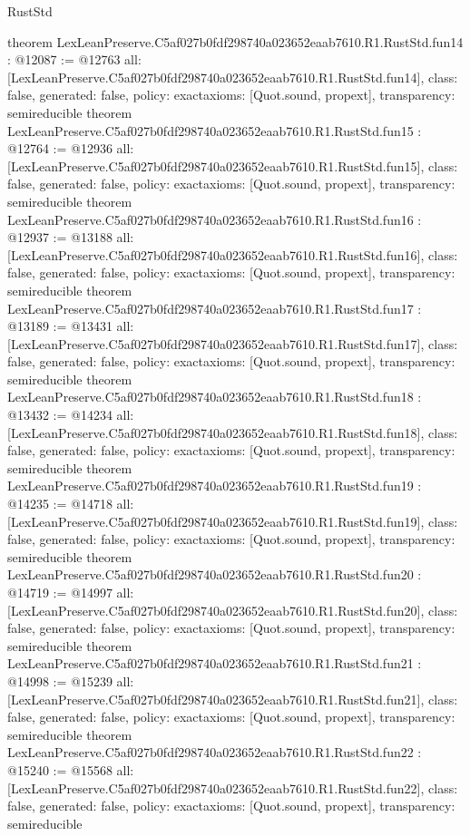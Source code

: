 \begin{lexlean}{RustStd}
\begin{coremodule}
{}
theorem LexLeanPreserve.C5af027b0fdf298740a023652eaab7610.R1.RustStd.fun14 : @12087 := @12763 {
  all: [LexLeanPreserve.C5af027b0fdf298740a023652eaab7610.R1.RustStd.fun14],
  class: false,
  generated: false,
  policy: exact{axioms: [Quot.sound, propext]},
  transparency: semireducible
}
theorem LexLeanPreserve.C5af027b0fdf298740a023652eaab7610.R1.RustStd.fun15 : @12764 := @12936 {
  all: [LexLeanPreserve.C5af027b0fdf298740a023652eaab7610.R1.RustStd.fun15],
  class: false,
  generated: false,
  policy: exact{axioms: [Quot.sound, propext]},
  transparency: semireducible
}
theorem LexLeanPreserve.C5af027b0fdf298740a023652eaab7610.R1.RustStd.fun16 : @12937 := @13188 {
  all: [LexLeanPreserve.C5af027b0fdf298740a023652eaab7610.R1.RustStd.fun16],
  class: false,
  generated: false,
  policy: exact{axioms: [Quot.sound, propext]},
  transparency: semireducible
}
theorem LexLeanPreserve.C5af027b0fdf298740a023652eaab7610.R1.RustStd.fun17 : @13189 := @13431 {
  all: [LexLeanPreserve.C5af027b0fdf298740a023652eaab7610.R1.RustStd.fun17],
  class: false,
  generated: false,
  policy: exact{axioms: [Quot.sound, propext]},
  transparency: semireducible
}
theorem LexLeanPreserve.C5af027b0fdf298740a023652eaab7610.R1.RustStd.fun18 : @13432 := @14234 {
  all: [LexLeanPreserve.C5af027b0fdf298740a023652eaab7610.R1.RustStd.fun18],
  class: false,
  generated: false,
  policy: exact{axioms: [Quot.sound, propext]},
  transparency: semireducible
}
theorem LexLeanPreserve.C5af027b0fdf298740a023652eaab7610.R1.RustStd.fun19 : @14235 := @14718 {
  all: [LexLeanPreserve.C5af027b0fdf298740a023652eaab7610.R1.RustStd.fun19],
  class: false,
  generated: false,
  policy: exact{axioms: [Quot.sound, propext]},
  transparency: semireducible
}
theorem LexLeanPreserve.C5af027b0fdf298740a023652eaab7610.R1.RustStd.fun20 : @14719 := @14997 {
  all: [LexLeanPreserve.C5af027b0fdf298740a023652eaab7610.R1.RustStd.fun20],
  class: false,
  generated: false,
  policy: exact{axioms: [Quot.sound, propext]},
  transparency: semireducible
}
theorem LexLeanPreserve.C5af027b0fdf298740a023652eaab7610.R1.RustStd.fun21 : @14998 := @15239 {
  all: [LexLeanPreserve.C5af027b0fdf298740a023652eaab7610.R1.RustStd.fun21],
  class: false,
  generated: false,
  policy: exact{axioms: [Quot.sound, propext]},
  transparency: semireducible
}
theorem LexLeanPreserve.C5af027b0fdf298740a023652eaab7610.R1.RustStd.fun22 : @15240 := @15568 {
  all: [LexLeanPreserve.C5af027b0fdf298740a023652eaab7610.R1.RustStd.fun22],
  class: false,
  generated: false,
  policy: exact{axioms: [Quot.sound, propext]},
  transparency: semireducible
}
\end{coremodule}
\end{lexlean}
